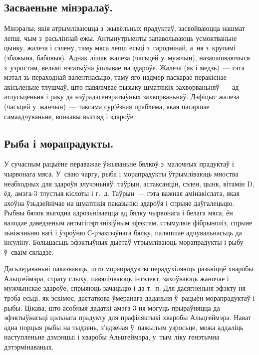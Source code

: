 \subsection{Засваеньне мінэралаў.}
Мінэралы, якія атрымліваюцца з~жывёльных прадуктаў, засвойваюцца нашмат лепш, чым з~расьліннай ежы. Антынутрыенты запавольваюць усмоктваньне цынку, жалеза і сэлену, таму мяса лепш есьці з~гароднінай, а~ня з~крупамі (збажына, бабовыя). Аднак лішак жалеза (часьцей у~мужчын), назапашваючыся з~узростам, вельмі нэгатыўна ўплывае на здароўе. Жалеза (як і медзь)~--- гэта мэтал зь пераходнай валентнасьцю, таму яго надмер паскарае перакіснае акісьленьне тлушчаў, што павялічвае рызыку шматлікіх захворваньняў~--- ад атлусьценьня і раку да нэўрадэгенэратыўных захворваньняў. Дэфіцыт жалеза (часьцей у~жанчын)~--- таксама сур'ёзная праблема, якая пагаршае самаадчуваньне, вонкавы выгляд і здароўе.


\subsection{Рыба і морапрадукты.}
У сучасным рацыёне пераважае ўжываньне бялкоў з~малочных прадуктаў і чырвонага мяса. У~сваю чаргу, рыба і морапрадукты ўтрымліваюць мноства неабходных для здароўя злучэньняў: таўрын, астаксанцін, сэлен, цынк, вітамін D, ёд, амэга-3 тлустыя кіслоты і г.~д. Таўрын~--- гэта важная амінакіслата, якая ахоўна ўзьдзейнічае на шматлікія паказьнікі здароўя і спрыяе даўгалецьцю. Рыбны бялок выгодна адрозьніваецца ад бялку чырвонага і белага мяса, ён валодае даведзеным антыгіпэртэнізіўным эфэктам, стымулюе фібрыноліз, спрыяе зьніжэньню вагі і ўзроўню С-рэактыўнага бялку, паляпшае адчувальнасьць да інсуліну. Большасьць эфэктыўных дыетаў утрымліваюць морапрадукты і рыбу ў~сваім складзе.

Дасьледаваньні паказваюць, што морапрадукты перадухіляюць разьвіццё хваробы Альцгеймэра, страту слыху, павялічваюць інтэлект, захоўваюць жаночае і мужчынскае здароўе, спрыяюць зачацьцю і да т.~п. Для дасягненьня эфэкту ня трэба есьці, як эскімос, дастаткова ўмеранага даданьня ў~рацыён морапрадуктаў і рыбы. Цікава, што асобныя дадаткі амэга-3 ня могуць прыраўняцца да эфэктыўнасьці цэльнага прадукту для прафіляктыкі хваробы Альцгеймэра. Нават адна порцыя рыбы на тыдзень, з'едзеная ў~пажылым узросьце, можа аддаліць наступленьне дэмэнцыі і хваробы Альцгеймэра, у~тым ліку генэтычна дэтэрмінаваных.

